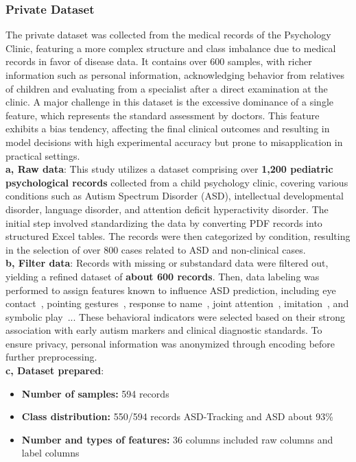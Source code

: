 \documentclass[conference]{IEEEtran}
\begin{document}
\subsubsection{Private Dataset}
The private dataset was collected from the medical records of the Psychology Clinic, featuring a more complex structure and class imbalance due to medical records in favor of disease data. It contains over 600 samples, with richer information such as personal information, acknowledging behavior from relatives of children and evaluating from a specialist after a direct examination at the clinic. A major challenge in this dataset is the excessive dominance of a single feature, which represents the standard assessment by doctors. This feature exhibits a bias tendency, affecting the final clinical outcomes and resulting in model decisions with high experimental accuracy but prone to misapplication in practical settings.\\
\textbf{a, Raw data}: This study utilizes a dataset comprising over \textbf{1,200 pediatric psychological records} collected from a child psychology clinic, covering various conditions such as Autism Spectrum Disorder (ASD), intellectual developmental disorder, language disorder, and attention deficit hyperactivity disorder. The initial step involved standardizing the data by converting PDF records into structured Excel tables. The records were then categorized by condition, resulting in the selection of over 800 cases related to ASD and non-clinical cases.\\
\textbf{b, Filter data}: Records with missing or substandard data were filtered out, yielding a refined dataset of \textbf{about 600 records}. Then, data labeling was performed to assign features known to influence ASD prediction, including eye contact~\cite{b8}, pointing gestures~\cite{b9}, response to name~\cite{b10}, joint attention~\cite{b11}, imitation~\cite{b12}, and symbolic play~\cite{b13}... These behavioral indicators were selected based on their strong association with early autism markers and clinical diagnostic standards. To ensure privacy, personal information was anonymized through encoding before further preprocessing.\\
\textbf{c, Dataset prepared}:
\begin{itemize}
    \item \textbf{Number of samples:} 594 records
    \item \textbf{Class distribution:} 550/594 records ASD-Tracking and ASD about 93\%
    \item \textbf{Number and types of features:} 36 columns included raw columns and label columns
\end{itemize}
\end{document}
